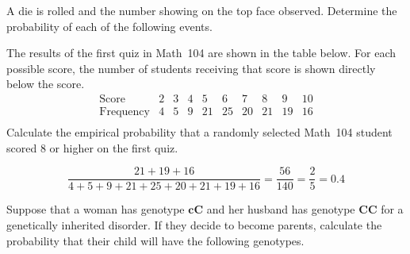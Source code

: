 \documentclass[answers,addpoints,12pt]{exam}
\begin{document}
\begin{questions}

\question[15] A die is rolled and the number
showing on the top face observed. Determine the probability
of each of the following events.
\ifprintanswers\else\newpage\fi

\question[10] The results of the first quiz in Math~104 are
shown in the table below. For each possible score, the number
of students receiving that score is shown directly below
the score.
\[\begin{array}{c|cccccccccc}
\text{Score}&2&3&4&5&6&7&8&9&10\\\hline
\text{Frequency}&4&5&9&21&25&20&21&19&16\\
\end{array}\]
Calculate the empirical probability that a randomly
selected Math~104 student scored $8$ or higher
on the first quiz.
\begin{solution}[2in]
\[\frac{21+19+16}{4+5+9+21+25+20+21+19+16}
=\frac{56}{140}=\frac{2}{5}=0.4\]
\end{solution}

\question[15] Suppose that a woman has genotype $\mathbold{cC}$
and her husband has genotype $\mathbold{CC}$ for a
genetically inherited disorder.
If they decide to become parents, calculate the
probability that their child will
have the following genotypes.
\end{questions}
\end{document}
